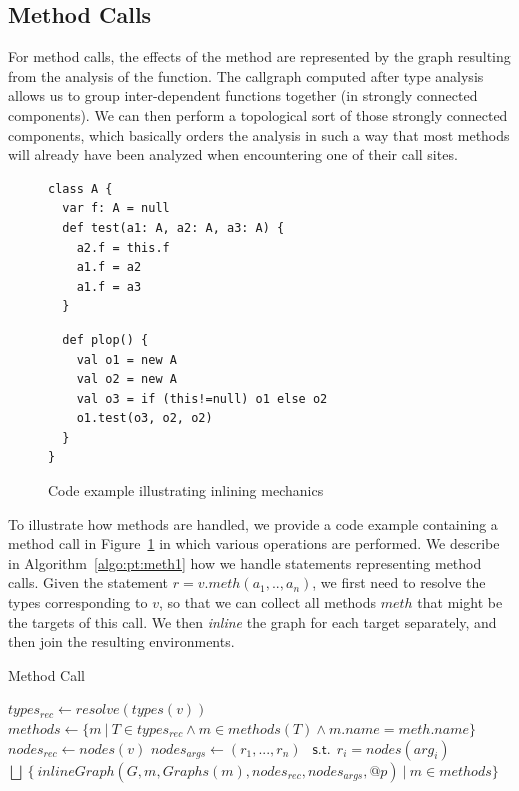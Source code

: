 \subsection{Method Calls}
\label{sec:pt:inlining}
For method calls, the effects of the method are represented by the graph
resulting from the analysis of the function. The callgraph computed after
type analysis allows us to group inter-dependent functions together (in
strongly connected components). We can then perform a topological sort of
those strongly connected components, which basically orders the analysis
in such a way that most methods will already have been analyzed when
encountering one of their call sites.

\begin{figure}[h]
    \centering
\begin{minipage}[t]{0.5\linewidth}
    \centering
    \lstset{linewidth=0.8\linewidth}
\begin{lstlisting}
class A {
  var f: A = null
  def test(a1: A, a2: A, a3: A) {
    a2.f = this.f
    a1.f = a2
    a1.f = a3
  }

\end{lstlisting}
\end{minipage}
\begin{minipage}[t]{0.5\linewidth}
    \centering
    \lstset{linewidth=0.8\linewidth}
\begin{lstlisting}
  def plop() {
    val o1 = new A
    val o2 = new A
    val o3 = if (this!=null) o1 else o2
    o1.test(o3, o2, o2)
  }
}
\end{lstlisting}
\end{minipage}
    \caption{Code example illustrating inlining mechanics}
    \label{fig:pt:inlinecode}
\end{figure}

To illustrate how methods are handled, we provide a code example containing a
method call in Figure~\ref{fig:pt:inlinecode} in which various operations are
performed. We describe in Algorithm~\ref{algo:pt:meth1} how we handle
statements representing method calls. Given the statement $r = v.meth(a_1, ..,
a_n)$, we first need to resolve the types corresponding to $v$, so that we can
collect all methods $meth$ that might be the targets of this call. We then
\emph{inline} the graph for each target separately, and then join the resulting
environments.

\begin{algorithm}
\caption{Method Call}\label{algo:pt:meth1}
\begin{algorithmic}[1]
    \State $types_{rec} \gets resolve(types(v))$
    \State $methods \gets \{ m ~|~ T \in types_{rec} \land m \in methods(T) \land m.name = meth.name \}$
    \State $nodes_{rec} \gets nodes(v)$
    \State $nodes_{args} \gets (r_1, ..., r_n) ~~\textsf{ s.t.}~~ r_i = nodes(arg_i)$
    \State \Return $\bigsqcup ~\{~ inlineGraph(G, m, Graphs(m), nodes_{rec}, nodes_{args}, @p) ~|~ m \in methods \}$
\EndFunction
\end{algorithmic}
\end{algorithm}

